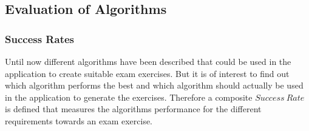 \begin{testexample}
\begin{minipage}{6in}
{
		}
	\end{minipage}
	\label{IllustrationAlgorithmSplitAndFillPart6}
	
\end{testexample}







\noindent
\begin{figure} [h]
	
\end{figure}

\clearpage
\pagebreak
\subsection{Evaluation of Algorithms} \label{AnalysisOfAlgorithms}
\subsubsection{Success Rates} \label{successRates}
\noindent Until now different algorithms have been described that could be used in the application to create suitable exam exercises. But it is of interest to find out which algorithm performs the best and which algorithm should actually be used in the application to generate the exercises. Therefore a composite $Success~Rate$ is defined that measures the algorithms performance for the different requirements towards an exam exercise.  \\

